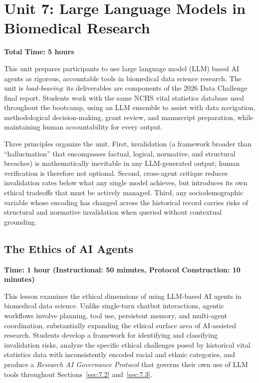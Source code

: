 \chapter{Unit 7: Large Language Models in Biomedical Research}
\label{chap:unit7}

\textbf{Total Time: 5 hours}

This unit prepares participants to use large language model (LLM)
based AI agents as rigorous, accountable tools in biomedical data
science research. The unit is \emph{load-bearing}: its deliverables
are components of the 2026 Data Challenge final report. Students
work with the same NCHS vital statistics database used throughout
the bootcamp, using an LLM ensemble to assist with data navigation,
methodological decision-making, grant review, and manuscript
preparation, while maintaining human accountability for every output.

Three principles organize the unit. First, invalidation
(a framework broader than ``hallucination'' that encompasses
factual, logical, normative, and structural breaches) is
mathematically inevitable in any LLM-generated output; human
verification is therefore not optional. Second, cross-agent
critique reduces invalidation rates below what any single model
achieves, but introduces its own ethical tradeoffs that must be
actively managed. Third,  any
sociodemographic variable whose encoding has changed across the
historical record 
carries risks of structural and normative invalidation when
queried without contextual grounding. 

\section{The Ethics of AI Agents}
\label{sec:7.1}

\textbf{Time: 1 hour (Instructional: 50 minutes, Protocol Construction: 10 minutes)}

This lesson examines the ethical dimensions of using LLM-based AI
agents in biomedical data science. Unlike single-turn chatbot
interactions, agentic workflows involve planning, tool use,
persistent memory, and multi-agent coordination, substantially
expanding the ethical surface area of AI-assisted research.
Students develop a framework for identifying and classifying
invalidation risks, analyze the specific ethical challenges posed
by historical vital statistics data with inconsistently encoded
racial and ethnic categories, and produce a \emph{Research AI
Governance Protocol} that governs their own use of LLM tools
throughout Sections~\ref{sec:7.2} and~\ref{sec:7.3}.

